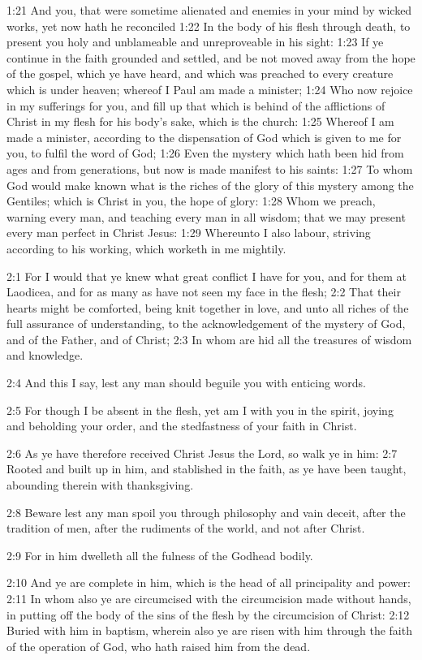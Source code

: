 1:21  And you, that were sometime alienated and enemies in your mind by
wicked works, yet now hath he reconciled
1:22  In the body of his flesh through death, to present you holy and
unblameable and unreproveable in his sight:
1:23  If ye continue in the faith grounded and settled, and be not moved
away from the hope of the gospel, which ye have heard, and which was preached
to every creature which is under heaven; whereof I Paul am made a minister;
1:24  Who now rejoice in my sufferings for you, and fill up that which is
behind of the afflictions of Christ in my flesh for his body's sake, which is
the church:
1:25  Whereof I am made a minister, according to the dispensation of God
which is given to me for you, to fulfil the word of God;
1:26  Even the mystery which hath been hid from ages and from generations,
but now is made manifest to his saints:
1:27  To whom God would make known what is the riches of the glory of this
mystery among the Gentiles; which is Christ in you, the hope of glory:
1:28  Whom we preach, warning every man, and teaching every man in all
wisdom; that we may present every man perfect in Christ Jesus:
1:29  Whereunto I also labour, striving according to his working, which
worketh in me mightily.

2:1  For I would that ye knew what great conflict I have for you, and for
them at Laodicea, and for as many as have not seen my face in the flesh;
2:2  That their hearts might be comforted, being knit together in love, and
unto all riches of the full assurance of understanding, to the
acknowledgement of the mystery of God, and of the Father, and of Christ;
2:3  In whom are hid all the treasures of wisdom and knowledge.

2:4  And this I say, lest any man should beguile you with enticing words.

2:5  For though I be absent in the flesh, yet am I with you in the spirit,
joying and beholding your order, and the stedfastness of your faith in
Christ.

2:6  As ye have therefore received Christ Jesus the Lord, so walk ye in
him:
2:7  Rooted and built up in him, and stablished in the faith, as ye have
been taught, abounding therein with thanksgiving.

2:8  Beware lest any man spoil you through philosophy and vain deceit,
after the tradition of men, after the rudiments of the world, and not after
Christ.

2:9  For in him dwelleth all the fulness of the Godhead bodily.

2:10  And ye are complete in him, which is the head of all principality and
power:
2:11  In whom also ye are circumcised with the circumcision made without
hands, in putting off the body of the sins of the flesh by the circumcision
of Christ:
2:12  Buried with him in baptism, wherein also ye are risen with him
through the faith of the operation of God, who hath raised him from the dead.


